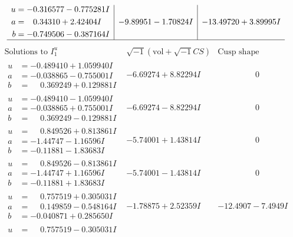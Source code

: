 \documentclass[1p]{elsarticle_modified}
\theoremstyle{definition}
\newcommand{\I}{\sqrt{-1}}
\begin{document}
$$\begin{array}{c|c|c}
\begin{aligned}
u &= -0.316577 - 0.775281 I \\
a &= \phantom{-}0.34310 + 2.42404 I \\
b &= -0.749506 - 0.387164 I\end{aligned}
 & -9.89951 - 1.70824 I & -13.49720 + 3.89995 I\\
 \hline 
 \end{array}$$\newpage$$\begin{array}{c|c|c}  
\text{Solutions to }I^u_{1}& \I (\text{vol} + \sqrt{-1}CS) & \text{Cusp shape}\\
 \hline 
\begin{aligned}
u &= -0.489410 + 1.059940 I \\
a &= -0.038865 - 0.755001 I \\
b &= \phantom{-}0.369249 + 0.129881 I\end{aligned}
 & -6.69274 + 8.82294 I & \phantom{-0.000000 } 0 \\ \hline\begin{aligned}
u &= -0.489410 - 1.059940 I \\
a &= -0.038865 + 0.755001 I \\
b &= \phantom{-}0.369249 - 0.129881 I\end{aligned}
 & -6.69274 - 8.82294 I & \phantom{-0.000000 } 0 \\ \hline\begin{aligned}
u &= \phantom{-}0.849526 + 0.813861 I \\
a &= -1.44747 - 1.16596 I \\
b &= -0.11881 - 1.83683 I\end{aligned}
 & -5.74001 + 1.43814 I & \phantom{-0.000000 } 0 \\ \hline\begin{aligned}
u &= \phantom{-}0.849526 - 0.813861 I \\
a &= -1.44747 + 1.16596 I \\
b &= -0.11881 + 1.83683 I\end{aligned}
 & -5.74001 - 1.43814 I & \phantom{-0.000000 } 0 \\ \hline\begin{aligned}
u &= \phantom{-}0.757519 + 0.305031 I \\
a &= \phantom{-}0.149859 - 0.548164 I \\
b &= -0.040871 + 0.285650 I\end{aligned}
 & -1.78875 + 2.52359 I & -12.4907 - 7.4949 I \\ \hline\begin{aligned}
u &= \phantom{-}0.757519 - 0.305031 I \\

\end{aligned}
\end{array}$$
\end{document}
